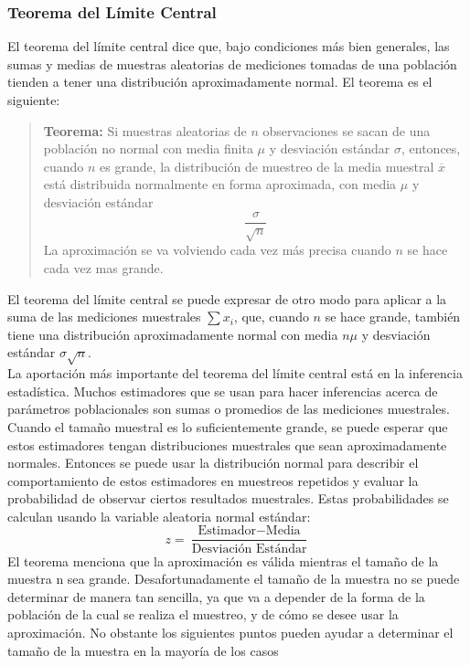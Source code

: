 \documentclass[]{article}
\begin{document}
\subsubsection{Teorema del Límite Central}
El teorema del límite central dice que, bajo condiciones más bien generales, las sumas y medias de muestras aleatorias de mediciones tomadas de una población tienden a tener una distribución aproximadamente normal. El teorema es el siguiente:
\begin{quote}
	\textbf{Teorema:} Si muestras aleatorias de $n$ observaciones se sacan de una población no normal con media finita $\mu$ y desviación estándar $\sigma$, entonces, cuando $n$ es grande, la distribución de muestreo de la media muestral $\overline{x}$ está distribuida normalmente en forma aproximada, con media $\mu$ y desviación estándar
	\[
	\frac{\sigma}{\sqrt{n}}
	\]
	La aproximación se va volviendo cada vez más precisa cuando $n$ se hace cada vez mas grande.
\end{quote}
El teorema del límite central se puede expresar de otro modo para aplicar a la suma de las mediciones muestrales $\sum{x_i}$, que, cuando $n$ se hace grande, también tiene una distribución aproximadamente normal con media $n\mu$ y desviación estándar $\sigma\sqrt{n}$.
\\ La aportación más importante del teorema del límite central está en la inferencia estadística. Muchos estimadores que se usan para hacer inferencias acerca de parámetros poblacionales son sumas o promedios de las mediciones muestrales. Cuando el tamaño muestral es lo suficientemente grande, se puede esperar que estos estimadores tengan distribuciones muestrales que sean aproximadamente normales. Entonces se puede usar la distribución normal para describir el comportamiento de estos estimadores en muestreos repetidos y evaluar la probabilidad de observar ciertos resultados muestrales. Estas probabilidades se calculan usando la variable aleatoria normal estándar:
\[
z = \frac{\text{Estimador} - \text{Media}}{\text{Desviación Estándar}}
\]
El teorema menciona que la aproximación es válida mientras el tamaño de la muestra n sea grande. Desafortunadamente el tamaño de la muestra no se puede determinar de manera tan sencilla, ya que va a depender de la forma de la población de la cual se realiza el muestreo, y de cómo se desee usar la aproximación. No obstante los siguientes puntos pueden ayudar a determinar el tamaño de la muestra en la mayoría de los casos
\end{document}
